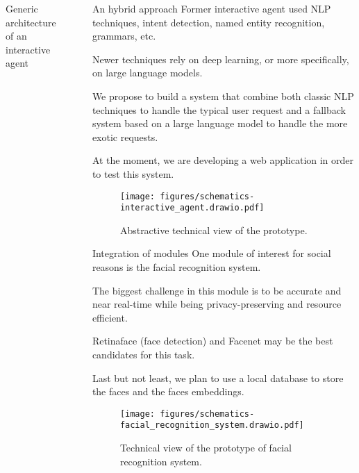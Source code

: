\documentclass[final]{beamer}
\newlength{\sepwidth}
\newlength{\colwidth}
\newcommand{\separatorcolumn}{\begin{column}{\sepwidth}\end{column}}
\begin{document}
\begin{frame}[t]
\begin{columns}[t]
\begin{column}{\colwidth}
\begin{alertblock}{Generic architecture of an interactive agent}
      \end{alertblock}

    \end{column}

    \separatorcolumn

    \begin{column}{\colwidth}

      \begin{block}{An hybrid approach}
        Former interactive agent used NLP techniques, intent detection, named entity recognition, grammars, etc.

        Newer techniques rely on deep learning, or more specifically, on large language models.

        We propose to build a system that combine both classic NLP techniques to handle the typical user request and a fallback system based on a large language model to handle the more exotic requests.

        At the moment, we are developing a web application in order to test this system.
        \begin{figure}[ht]
          \centering
          \texttt{[image: figures/schematics-interactive\_agent.drawio.pdf]}
          \caption{Abstractive technical view of the prototype.\label{fig:abstractive_view_interface}}
        \end{figure}
      \end{block}

      \begin{block}{Integration of modules}
        One module of interest for social reasons is the facial recognition system.

        The biggest challenge in this module is to be accurate and near real-time while being privacy-preserving and resource efficient.

        Retinaface\cite{dengRetinaFaceSinglestageDense2019} (face detection) and Facenet\cite{jekelClassifyingOnlineDating2018}  may be the best candidates for this task.

        Last but not least, we plan to use a local database to store the faces and the faces embeddings.

        \begin{figure}[!ht]
          \centering
          \texttt{[image: figures/schematics-facial\_recognition\_system.drawio.pdf]}
          \caption{Technical view of the prototype of facial recognition system.\label{fig:facial_recognition_technical_view}}
        \end{figure}
      \end{block}


\end{column}
\end{columns}
\end{frame}
\end{document}
